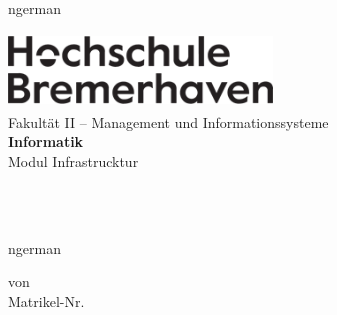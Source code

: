 \begin{titlepage}
	\pagestyle{empty}
	\centering

	\vspace*{0.5cm}
	\begin{otherlanguage*}{ngerman}
		\begin{sffamily}
			{
				\includegraphics[width=7cm, height=2cm]{images/hs-logo.png}\\[5mm]
				\Large
				Fakultät II -- Management und Informationssysteme\\[0.1em]
				\textbf{Informatik}\\[0.5em]
				Modul Infrastrucktur
			}
		\end{sffamily}
	\end{otherlanguage*}

	\vspace*{2cm}

	\begin{sffamily}
		\huge \bfseries
		\makeatletter
		\@title \\
		\Large
		\@subtitle
		\makeatother
		\\
	\end{sffamily}

	\vspace*{1cm}

	\begin{otherlanguage*}{ngerman}

		\vspace*{3cm}

		von\\[0.75em]
		{
		\large
		\textbf{\autor}\quad Matrikel-Nr. \matrikelnr\\

		\vspace*{2cm}
		\makeatletter
		\@date
		\makeatother
		}

		{
		\vspace*{3cm}
		\centering
		\large
		\makeatletter
		{\profA}\\
		\makeatother
		}

		\vfill
	\end{otherlanguage*}
\end{titlepage}